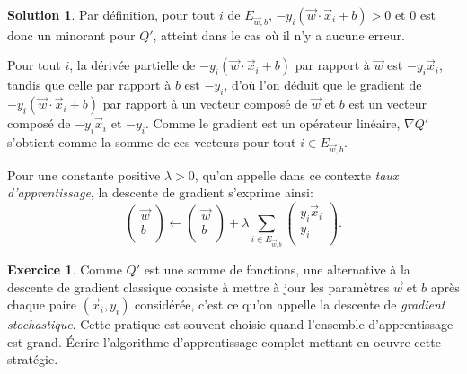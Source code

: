 \documentclass[a4paper,francais]{article}
\theoremstyle{definition}
\newtheorem{exercice}{Exercice}[section]
\newtheorem*{solution}{Solution}
\begin{document}
\begin{solution}
  Par définition, pour tout $i$ de $E_{\vec{w},b}$,
  $- y_i (\vec{w}\cdot\vec{x}_i + b) > 0$ et $0$ est donc un minorant pour $Q'$,
  atteint dans le cas où il n'y a aucune erreur. 
  
  Pour tout $i$, la dérivée partielle de $-y_i (\vec{w}\cdot\vec{x}_i + b)$
  par rapport à $\vec{w}$ est $-y_i\vec{x}_i$, tandis que celle par
  rapport à $b$ est $-y_i$, d'où l'on déduit que le gradient
  de $-y_i (\vec{w}\cdot\vec{x}_i + b)$ par rapport à un vecteur
  composé de $\vec{w}$ et $b$ est un vecteur composé de $-y_i\vec{x}_i$
  et $-y_i$. 
  Comme le gradient est un opérateur linéaire, $\nabla Q'$ s'obtient comme
  la somme de ces vecteurs pour tout $i\in E_{\vec{w},b}$.
  
  Pour une constante positive $\lambda > 0$, qu'on appelle dans ce
  contexte \emph{taux d'apprentissage}, la descente de gradient
  s'exprime ainsi:
  \[
  \left(\begin{array}{c}
    \vec{w} \\
    b \\
  \end{array}
  \right)
  \leftarrow
  \left(\begin{array}{c}
    \vec{w} \\
    b \\
  \end{array}
  \right)
  +
  \lambda
  \sum_{i\in E_{\vec{w},b}}
  \left(\begin{array}{c}
    y_i\vec{x}_i \\
    y_i \\
  \end{array}
  \right).
  \]  
\end{solution}

\begin{exercice}
  Comme $Q'$ est une somme de fonctions, une alternative à la descente de gradient classique
  consiste à mettre à jour les paramètres $\vec{w}$ et $b$ après chaque paire $(\vec{x}_i, y_i)$
  considérée, c'est ce qu'on appelle la descente de \emph{gradient stochastique}.
  Cette pratique est souvent choisie quand l'ensemble d'apprentissage est grand.
  \'Ecrire l'algorithme d'apprentissage complet mettant en oeuvre cette stratégie. 
\end{exercice}
\end{document}
